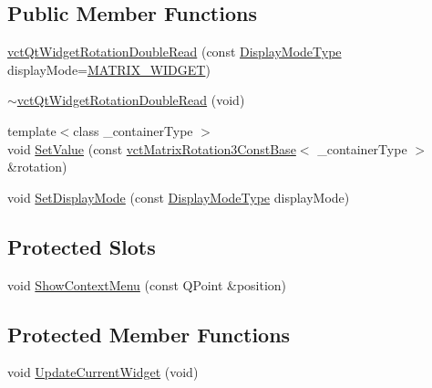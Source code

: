 \subsection*{Public Member Functions}
\begin{DoxyCompactItemize}
\item 
\hyperlink{classvct_qt_widget_rotation_double_read_a120fe39697d78152ac516e38d02d7357}{vct\-Qt\-Widget\-Rotation\-Double\-Read} (const \hyperlink{classvct_qt_widget_rotation_double_read_a77ae5a0ee5fe231ad2f9dd020aad434c}{Display\-Mode\-Type} display\-Mode=\hyperlink{classvct_qt_widget_rotation_double_read_a77ae5a0ee5fe231ad2f9dd020aad434cab4e7af571815b292da348c3526627d1e}{M\-A\-T\-R\-I\-X\-\_\-\-W\-I\-D\-G\-E\-T})
\item 
\hyperlink{classvct_qt_widget_rotation_double_read_a23e084ae43653d53fd20e85c6afe15cf}{$\sim$vct\-Qt\-Widget\-Rotation\-Double\-Read} (void)
\item 
{\footnotesize template$<$class \-\_\-container\-Type $>$ }\\void \hyperlink{classvct_qt_widget_rotation_double_read_a95a74bc313cea4a4a1d9db2d6fd49634}{Set\-Value} (const \hyperlink{classvct_matrix_rotation3_const_base}{vct\-Matrix\-Rotation3\-Const\-Base}$<$ \-\_\-container\-Type $>$ \&rotation)
\item 
void \hyperlink{classvct_qt_widget_rotation_double_read_a4ac3504e0f8622435ffbf4ded556294e}{Set\-Display\-Mode} (const \hyperlink{classvct_qt_widget_rotation_double_read_a77ae5a0ee5fe231ad2f9dd020aad434c}{Display\-Mode\-Type} display\-Mode)
\end{DoxyCompactItemize}
\subsection*{Protected Slots}
\begin{DoxyCompactItemize}
\item 
void \hyperlink{classvct_qt_widget_rotation_double_read_a94e6927e3694916be09be2c182bc5c37}{Show\-Context\-Menu} (const Q\-Point \&position)
\end{DoxyCompactItemize}
\subsection*{Protected Member Functions}
\begin{DoxyCompactItemize}
\item 
void \hyperlink{classvct_qt_widget_rotation_double_read_a23e91f048fc3893276985fdc13309a39}{Update\-Current\-Widget} (void)
\end{DoxyCompactItemize}

